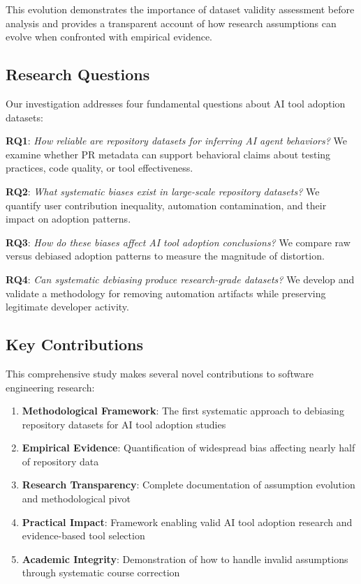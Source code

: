 \documentclass[conference]{IEEEtran}
\begin{document}
This evolution demonstrates the importance of dataset validity assessment before analysis and provides a transparent account of how research assumptions can evolve when confronted with empirical evidence.

\subsection{Research Questions}

Our investigation addresses four fundamental questions about AI tool adoption datasets:

\textbf{RQ1}: \textit{How reliable are repository datasets for inferring AI agent behaviors?} We examine whether PR metadata can support behavioral claims about testing practices, code quality, or tool effectiveness.

\textbf{RQ2}: \textit{What systematic biases exist in large-scale repository datasets?} We quantify user contribution inequality, automation contamination, and their impact on adoption patterns.

\textbf{RQ3}: \textit{How do these biases affect AI tool adoption conclusions?} We compare raw versus debiased adoption patterns to measure the magnitude of distortion.

\textbf{RQ4}: \textit{Can systematic debiasing produce research-grade datasets?} We develop and validate a methodology for removing automation artifacts while preserving legitimate developer activity.

\subsection{Key Contributions}

This comprehensive study makes several novel contributions to software engineering research:

\begin{enumerate}
    \item \textbf{Methodological Framework}: The first systematic approach to debiasing repository datasets for AI tool adoption studies
    \item \textbf{Empirical Evidence}: Quantification of widespread bias affecting nearly half of repository data
    \item \textbf{Research Transparency}: Complete documentation of assumption evolution and methodological pivot
    \item \textbf{Practical Impact}: Framework enabling valid AI tool adoption research and evidence-based tool selection
    \item \textbf{Academic Integrity}: Demonstration of how to handle invalid assumptions through systematic course correction
\end{enumerate}
\end{document}
